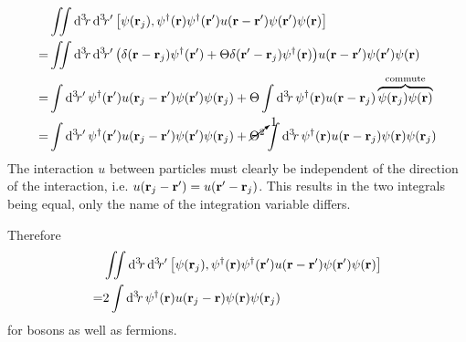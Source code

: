 \documentclass[11pt,letter, swedish, english
]{article}
\begin{document}
\begin{equation}
\begin{aligned}
&\iint\rd^3\!r\,\rd^3\!r'\,
\comm{\psi(\vb{r}_j)}{
\psi^\dagger(\vb{r})\psi^\dagger(\vb{r}')
u(\vb{r}-\vb{r}')\psi(\vb{r}')\psi(\vb{r})}\\
=&\iint\rd^3\!r\,\rd^3\!r'\,
\qty(
\delta(\vb{r}-\vb{r}_j) \psi^\dagger(\vb{r}')
+\Theta\delta(\vb{r}'-\vb{r}_j)\psi^\dagger(\vb{r})
)
u(\vb{r}-\vb{r}')\psi(\vb{r}')\psi(\vb{r})\\
=&\int\rd^3\!r'\,
\psi^\dagger(\vb{r}')u(\vb{r}_j-\vb{r}')\psi(\vb{r}')\psi(\vb{r}_j)
+\Theta\int\rd^3\!r\,
\psi^\dagger(\vb{r})u(\vb{r}-\vb{r}_j)
\commute{\psi(\vb{r}_j)\psi(\vb{r})}\\
=&\int\rd^3\!r'\,
\psi^\dagger(\vb{r}')u(\vb{r}_j-\vb{r}')\psi(\vb{r}')\psi(\vb{r}_j)
+\cancelto{1}{\Theta^2}\int\rd^3\!r\,
\psi^\dagger(\vb{r})u(\vb{r}-\vb{r}_j)
\psi(\vb{r})\psi(\vb{r}_j)\\
\end{aligned}
\end{equation}
The interaction $u$ between particles must clearly be
independent of the direction of the interaction,
i.e. $u(\vb{r}_j-\vb{r}')=u(\vb{r}'-\vb{r}_j)$. This results in the
two integrals being equal, only the name of the integration variable
differs. 

Therefore
\begin{equation}\label{eq:4_comm_ii}
\begin{aligned}
&\iint\rd^3\!r\,\rd^3\!r'\,
\comm{\psi(\vb{r}_j)}{
\psi^\dagger(\vb{r})\psi^\dagger(\vb{r}')
u(\vb{r}-\vb{r}')\psi(\vb{r}')\psi(\vb{r})}\\
=&2\int\rd^3\!r\,
\psi^\dagger(\vb{r})u(\vb{r}_j-\vb{r})\psi(\vb{r})\psi(\vb{r}_j)
\end{aligned}
\end{equation}
for bosons as well as fermions.
\end{document}
